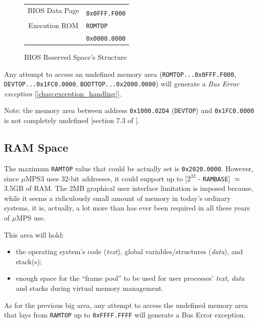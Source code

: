 \documentclass[12pt,a4paper,openright,twoside]{report}
\begin{document}
\begin{figure}[ht]
\begin{tabular}{cl}
		\multicolumn{1}{|c|}{\multirow{2}{*}{BIOS Data Page}}               &                                       \\ [-1ex]
		\multicolumn{1}{|c|}{}                                              & \multirow{2}{*}{\texttt{0x0FFF.F000}} \\ \cline{1-1}
		\multicolumn{1}{|l|}{\multirow{2}{*}{\cellcolor{gray}}}             &                                       \\ [-3ex]
		\multicolumn{1}{|l|}{\cellcolor{gray}}                              & \multirow{2}{*}{\texttt{ROMTOP}}      \\ \cline{1-1}
		\multicolumn{1}{|c|}{\multirow{2}{*}{Execution ROM}}                &                                       \\ [-1ex]
		\multicolumn{1}{|c|}{}                                              & \multirow{2}{*}{\texttt{0x0000.0000}} \\ \cline{1-1}
		\multicolumn{1}{l}{}                                                &
	\end{tabular}
	\caption{BIOS Reserved Space's Structure}
	\label{fig:kernel_reserved_space}
\end{figure}
Any attempt to access an undefined memory area (\texttt{ROMTOP...0x0FFF.F000}, \texttt{DEVTOP...0x1FC0.0000}, \texttt{BOOTTOP...0x2000.0000}) will generate a \textit{Bus Error exception} [\autoref{chap:exception_handling}].

Note: the memory area between address \texttt{0x1000.02D4} (\texttt{DEVTOP}) and \texttt{0x1FC0.0000} is not completely undefined [section 7.3 of \cite{old_pops}].

\subsection{RAM Space}
The maximum \texttt{RAMTOP} value that could be actually set is \texttt{0x2020.0000}.
However, since $\mu$MPS3 uses 32-bit addresses, it could support up to [$2^{32}$ - \texttt{RAMBASE}] $\simeq$ 3.5GB of RAM.
The 2MB graphical user interface limitation is imposed because, while it seems a ridiculously small amount of memory in today's ordinary systems, it is, actually, a lot more than has ever been required in all these years of $\mu$MPS use.

This area will hold:
\begin{itemize}
	\item the operating system's code (\textit{text}), global variables/structures (\textit{data}), and stack(s);
	\item enough space for the ``frame pool'' to be used for user processes' \textit{text}, \textit{data} and stacks during virtual memory management.
\end{itemize}
As for the previous big area, any attempt to access the undefined memory area that lays from \texttt{RAMTOP} up to \texttt{0xFFFF.FFFF} will generate a Bus Error exception.
\end{document}
